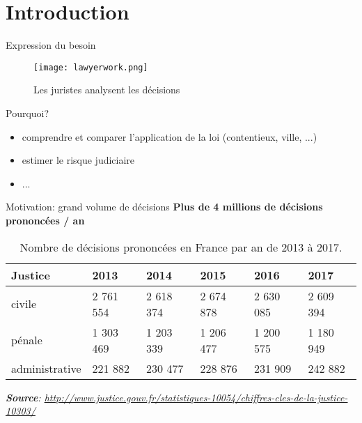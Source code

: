 \section{Introduction}

\begin{frame}[c]{Expression du besoin}
	
	\begin{figure}
		\texttt{[image: lawyerwork.png]}
		\caption{Les juristes analysent les décisions}
	\end{figure}
	
	\begin{block}{Pourquoi?}
		\begin{itemize}
			\item comprendre et comparer l'application de la loi (contentieux, ville, ...)
			\item estimer le risque judiciaire
			\item ... %
		\end{itemize}
	\end{block}
\end{frame}

\begin{frame}[c]{Motivation: grand volume de décisions}
	\textbf{Plus de 4 millions de décisions prononcées / an}
	\begin{table}[!htb]
		\scriptsize
		\begin{center}
			\begin{tabular}{|l|l|l|l|l|l|}
				\hline
				\textbf{Justice}	& \textbf{2013}  & \textbf{2014}  & \textbf{2015}  & \textbf{2016}  & \textbf{2017}  \\ \hline
				civile   & 2 761 554 & 2 618 374 & 2 674 878 & 2 630 085 & 2 609 394 \\ \hline
				pénale   & 1 303 469 & 1 203 339 & 1 206 477 & 1 200 575 & 1 180 949 \\ \hline
				administrative & 221 882 & 230 477 & 228 876 & 231 909 & 242 882 \\ \hline
			\end{tabular}
			
			\textit{\tiny{\textbf{Source}: \url{http://www.justice.gouv.fr/statistiques-10054/chiffres-cles-de-la-justice-10303/}}}  
		\end{center}
		\caption{Nombre de décisions prononcées en France par an de 2013 à 2017.}\label{tab:intro:nbdecisionstats}
	\end{table}
\end{frame}

